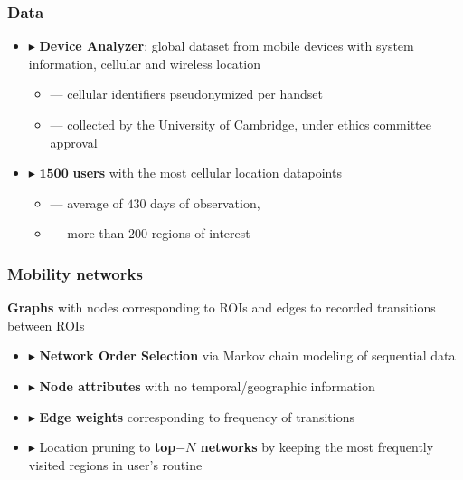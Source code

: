 \documentclass[hyperref={colorlinks = true},unknownkeysallowed]{beamer}
\let\oldcitep=\citep
\renewcommand\citep[1]{\hypersetup{linkcolor=UBCblue}\hyperlink{#1}{\oldcitep{#1}}}
\begin{document}
\begin{frame}
	\frametitle{Data}
	\vspace{0.7cm}
	\begin{itemize}
		\item  $\blacktriangleright$ \textbf{Device Analyzer}: global dataset from mobile devices with
		system information, cellular and wireless location
		\begin{itemize}
			\item --- cellular identifiers pseudonymized per handset
			\item --- collected by the University of Cambridge, under ethics committee approval
		\end{itemize}
		\vspace{0.2cm}
		\item $\blacktriangleright$ $ \mathbf{1500} $ \textbf{users} with the most cellular location datapoints
		\begin{itemize}
		\item --- average
		of $ 430 $ days of observation, 
		\item --- more than $ 200 $ regions of interest
		\end{itemize}
	\end{itemize}
\end{frame}



\begin{frame}
	\frametitle{Mobility networks}
	\begin{tcolorbox}[colback=green!5,colframe=white!40!black]
		\textbf{Graphs} with nodes corresponding to
	ROIs and edges to recorded transitions between ROIs
	\end{tcolorbox}
	\begin{itemize}
		\item $\blacktriangleright$  \textbf{Network Order Selection} via Markov chain modeling of
	sequential data {\footnotesize \citep{scholtes2017network}}
		\item $\blacktriangleright$  \textbf{Node attributes} with no temporal/geographic information
		\item $\blacktriangleright$  \textbf{Edge weights} corresponding to frequency of transitions
		\item  $\blacktriangleright$  Location pruning to \textbf{top$-N$ networks} by keeping the most frequently visited regions in user's routine
	\end{itemize}
\end{frame}
\end{document}
